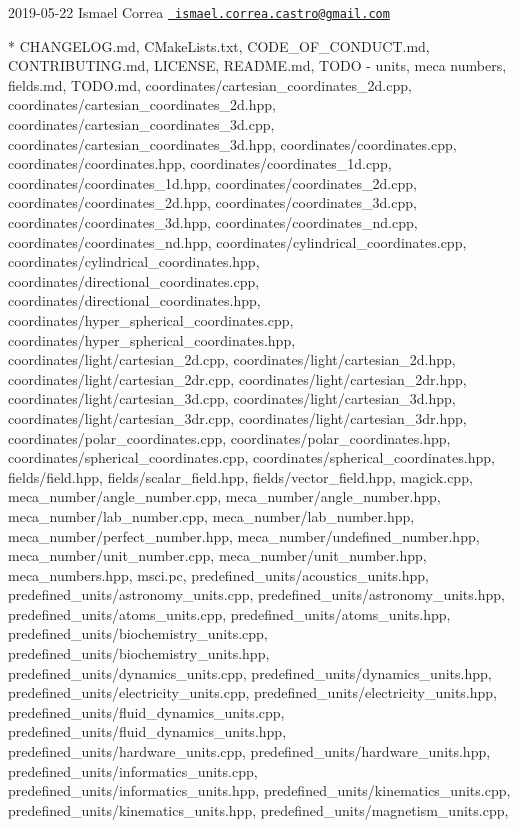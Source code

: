  2019-\/05-\/22 Ismael Correa \href{mailto:ismael.correa.castro@gmail.com}{\texttt{ ismael.\+correa.\+castro@gmail.\+com}} \begin{DoxyVerb}* CHANGELOG.md, CMakeLists.txt, CODE_OF_CONDUCT.md,
CONTRIBUTING.md, LICENSE, README.md, TODO - units, meca numbers,
fields.md, TODO.md, coordinates/cartesian_coordinates_2d.cpp,
coordinates/cartesian_coordinates_2d.hpp,
coordinates/cartesian_coordinates_3d.cpp,
coordinates/cartesian_coordinates_3d.hpp,
coordinates/coordinates.cpp, coordinates/coordinates.hpp,
coordinates/coordinates_1d.cpp, coordinates/coordinates_1d.hpp,
coordinates/coordinates_2d.cpp, coordinates/coordinates_2d.hpp,
coordinates/coordinates_3d.cpp, coordinates/coordinates_3d.hpp,
coordinates/coordinates_nd.cpp, coordinates/coordinates_nd.hpp,
coordinates/cylindrical_coordinates.cpp,
coordinates/cylindrical_coordinates.hpp,
coordinates/directional_coordinates.cpp,
coordinates/directional_coordinates.hpp,
coordinates/hyper_spherical_coordinates.cpp,
coordinates/hyper_spherical_coordinates.hpp,
coordinates/light/cartesian_2d.cpp,
coordinates/light/cartesian_2d.hpp,
coordinates/light/cartesian_2dr.cpp,
coordinates/light/cartesian_2dr.hpp,
coordinates/light/cartesian_3d.cpp,
coordinates/light/cartesian_3d.hpp,
coordinates/light/cartesian_3dr.cpp,
coordinates/light/cartesian_3dr.hpp,
coordinates/polar_coordinates.cpp,
coordinates/polar_coordinates.hpp,
coordinates/spherical_coordinates.cpp,
coordinates/spherical_coordinates.hpp, fields/field.hpp,
fields/scalar_field.hpp, fields/vector_field.hpp, magick.cpp,
meca_number/angle_number.cpp, meca_number/angle_number.hpp,
meca_number/lab_number.cpp, meca_number/lab_number.hpp,
meca_number/perfect_number.hpp, meca_number/undefined_number.hpp,
meca_number/unit_number.cpp, meca_number/unit_number.hpp,
meca_numbers.hpp, msci.pc, predefined_units/acoustics_units.hpp,
predefined_units/astronomy_units.cpp,
predefined_units/astronomy_units.hpp,
predefined_units/atoms_units.cpp, predefined_units/atoms_units.hpp,
predefined_units/biochemistry_units.cpp,
predefined_units/biochemistry_units.hpp,
predefined_units/dynamics_units.cpp,
predefined_units/dynamics_units.hpp,
predefined_units/electricity_units.cpp,
predefined_units/electricity_units.hpp,
predefined_units/fluid_dynamics_units.cpp,
predefined_units/fluid_dynamics_units.hpp,
predefined_units/hardware_units.cpp,
predefined_units/hardware_units.hpp,
predefined_units/informatics_units.cpp,
predefined_units/informatics_units.hpp,
predefined_units/kinematics_units.cpp,
predefined_units/kinematics_units.hpp,
predefined_units/magnetism_units.cpp,

\end{DoxyVerb}
